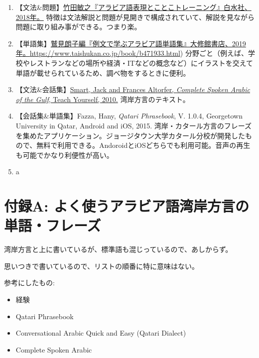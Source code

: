 \documentclass[
]{book}
\providecommand{\tightlist}{%
  \setlength{\itemsep}{0pt}\setlength{\parskip}{0pt}}
\begin{document}
\begin{enumerate}
\def\labelenumi{\arabic{enumi}.}
\tightlist
\item
  【文法\&問題】\href{https://www.hakusuisha.co.jp/book/b348647.html}{竹田敏之『アラビア語表現とことこトレーニング』白水社、2018年。} 特徴は文法解説と問題が見開きで構成されていて、解説を見ながら問題に取り組み事ができる。つまり楽。
\item
  【単語集】\href{（}{鷲見朗子編『例文で学ぶアラビア語単語集』大修館書店、2019年。}\url{https://www.taishukan.co.jp/book/b471933.html}) 分野ごと（例えば、学校やレストランなどの場所や経済・ITなどの概念など）にイラストを交えて単語が載せられているため、調べ物をするときに便利。
\item
  【文法\&会話集】\href{https://www.bookdepository.com/Complete-Spoken-Arabic-Arabian-Gulf-Beginner-Intermediate-Course-Frances-Smart/9781444105469?ref=grid-view\&qid=1669905445206\&sr=1-1}{Smart, Jack and Frances Altorfer, \emph{Complete Spoken Arabic of the Gulf}, Teach Yourself, 2010.} 湾岸方言のテキスト。
\item
  【会話集\&単語集】Fazza, Hany, \emph{Qatari Phrasebook}, V. 1.0.4, Georgetown University in Qatar, Android and iOS, 2015. 湾岸・カタール方言のフレーズを集めたアプリケーション。ジョージタウン大学カタール分校が開発したもので、無料で利用できる。AndoroidとiOSどちらでも利用可能。音声の再生も可能でかなり利便性が高い。
\item
  a
\end{enumerate}

\hypertarget{appendix_a}{%
\chapter*{付録A: よく使うアラビア語湾岸方言の単語・フレーズ}\label{appendix_a}}

湾岸方言と上に書いているが、標準語も混じっているので、あしからず。

思いつきで書いているので、リストの順番に特に意味はない。

参考にしたもの:

\begin{itemize}
\tightlist
\item
  経験
\item
  Qatari Phrasebook
\item
  Conversational Arabic Quick and Easy (Qatari Dialect)
\item
  Complete Spoken Arabic
\end{itemize}
\end{document}
